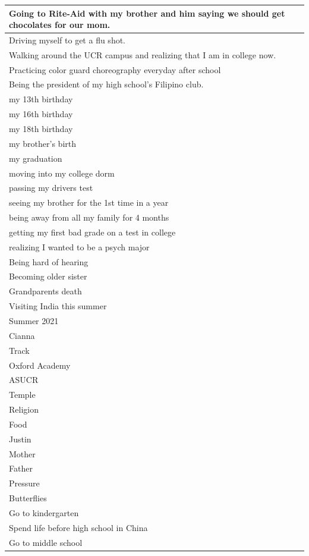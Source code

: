\documentclass[
  .7em,
  letterpaper,
  DIV=11,
  numbers=noendperiod]{scrartcl}
\begin{document}
\begin{table}
\begin{tabular}{l}
\hline
Going to Rite-Aid with my brother and him saying we should get chocolates for our mom.\\
\hline
Driving myself to get a flu shot.\\
\hline
Walking around the UCR campus and realizing that I am in college now.\\
\hline
Practicing color guard choreography everyday after school\\
\hline
Being the president of my high school's Filipino club.\\
\hline
my 13th birthday\\
\hline
my 16th birthday\\
\hline
my 18th birthday\\
\hline
my brother's birth\\
\hline
my graduation\\
\hline
moving into my college dorm\\
\hline
passing my drivers test\\
\hline
seeing my brother for the 1st time in a year\\
\hline
being away from all my family for 4 months\\
\hline
getting my first bad grade on a test in college\\
\hline
realizing I wanted to be a psych major\\
\hline
Being hard of hearing\\
\hline
Becoming older sister\\
\hline
Grandparents death\\
\hline
Visiting India this summer\\
\hline
Summer 2021\\
\hline
Cianna\\
\hline
Track\\
\hline
Oxford Academy\\
\hline
ASUCR\\
\hline
Temple\\
\hline
Religion\\
\hline
Food\\
\hline
Justin\\
\hline
Mother\\
\hline
Father\\
\hline
Pressure\\
\hline
Butterflies\\
\hline
Go to kindergarten\\
\hline
Spend life before high school in China\\
\hline
Go to middle school\\

\end{tabular}
\end{table}
\end{document}
